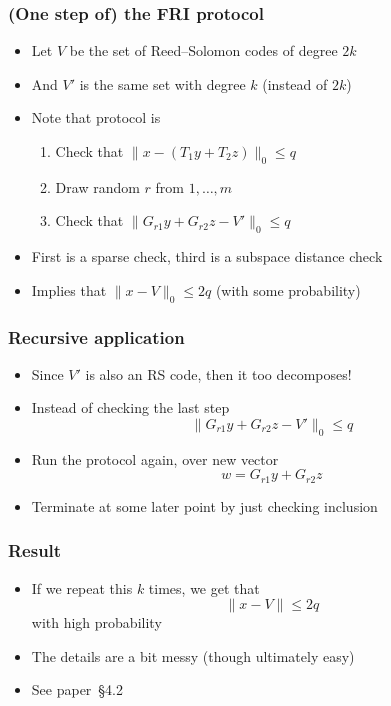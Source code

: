 \documentclass{beamer}
\begin{document}
    \begin{frame}
        \frametitle{(One step of) the FRI protocol}
        \begin{itemize}\itemsep=12pt
            \item Let $V$ be the set of Reed--Solomon codes of degree $2k$
            \item And $V'$ is the same set with degree $k$ (instead of $2k$)
            \item Note that protocol is
            \begin{enumerate}\itemsep=8pt
                \item Check that $\|x - (T_1y + T_2z)\|_0 \le q$
                \item Draw random $r$ from $1, \dots, m$
                \item Check that $\|G_{r1}y + G_{r2}z - V'\|_0 \le q$
            \end{enumerate}
            \pause
            \item First is a sparse check, third is a subspace distance check
            \item Implies that $\|x - V\|_0 \le 2q$ (with some probability)
        \end{itemize}
	\end{frame}
    \begin{frame}
        \frametitle{Recursive application}
        \begin{itemize}\itemsep=12pt
            \item Since $V'$ is also an RS code, then it too decomposes!
            \item Instead of checking the last step
            \[
                \|G_{r1}y + G_{r2}z - V'\|_0 \le q
            \]
            \item Run the protocol again, over new vector
            \[
                w = G_{r1}y + G_{r2}z
            \]
            
            \pause
            \item Terminate at some later point by just checking inclusion
        \end{itemize}
	\end{frame}
    \begin{frame}
        \frametitle{Result}
        \begin{itemize}\itemsep=12pt
            \item If we repeat this $k$ times, we get that
            \[
                \|x - V\| \le 2q
            \]
            with high probability
            \item The details are a bit messy (though ultimately easy)
            \item See paper~\S4.2
        \end{itemize}
	\end{frame}
\end{document}
